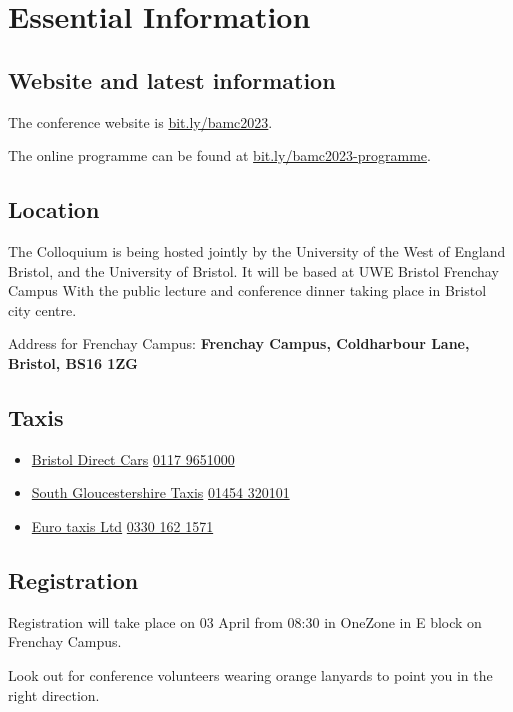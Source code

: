 \documentclass[12pt,a4paper]{article}
\begin{document}
\section{Essential Information}

\subsection{Website and latest information}

The conference website is \href{https://bit.ly/bamc2023}{bit.ly/bamc2023}.

The online programme can be found at \href{https://bit.ly/bamc2023-programme}{bit.ly/bamc2023-programme}.

\subsection{Location}

The Colloquium is being hosted jointly by the University of the West of England Bristol, and the University of Bristol. It will be based at UWE Bristol Frenchay Campus With the public lecture and conference dinner taking place in Bristol city centre.

Address for Frenchay Campus: \textbf{Frenchay Campus, Coldharbour Lane, Bristol, BS16 1ZG}

\subsection{Taxis}

\begin{itemize}
\item \href{http://www.bristoldirectcars.co.uk/}{Bristol Direct Cars} \href{tel:01179651000}{0117 9651000}
\item \href{http://www.southgloscabs.co.uk/}{South Gloucestershire Taxis} \href{tel:01454320101}{01454 320101}
\item \href{https://www.eurotaxis.com/taxis/}{Euro taxis Ltd} \href{tel:03301621571}{0330 162 1571}
\end{itemize}

\subsection{Registration}

Registration will take place on 03 April from 08:30 in OneZone in E block on Frenchay Campus.

Look out for conference volunteers wearing orange lanyards to point you in the right direction.
\end{document}
